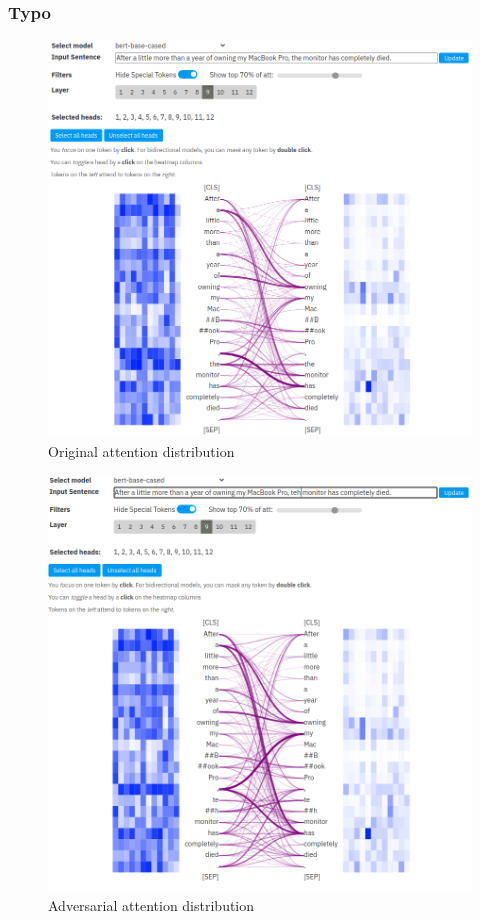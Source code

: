 \subsubsection{Typo}

\begin{figure}
    \centering
    \includegraphics[width =.8\textwidth]{img/attention_typo_originalpng.png}
    \caption{Original attention distribution}
    \label{fig:attention_typo_original}
\end{figure}

\begin{figure}
    \centering
    \includegraphics[width =.8\textwidth]{img/attention_typo_modified.png}
    \caption{Adversarial attention distribution}
    \label{fig:attention_typo_modified}
\end{figure}

